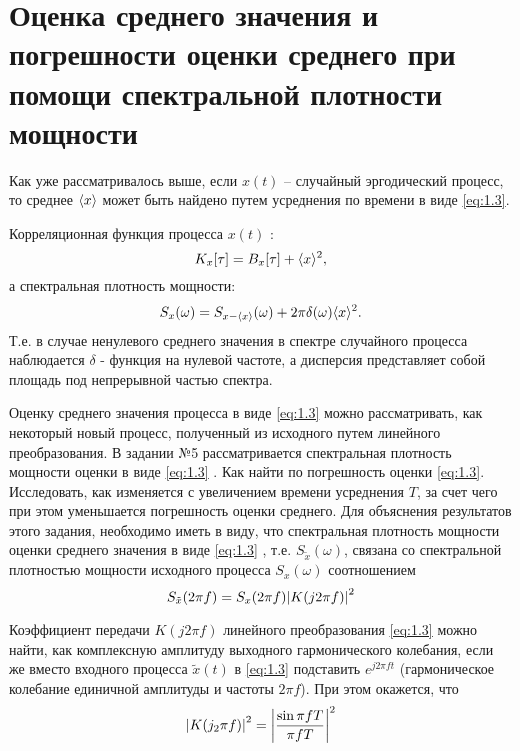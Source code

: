 \documentclass[a4paper,14pt]{extarticle}
\begin{document}
\section{Оценка среднего значения и погрешности оценки среднего при помощи спектральной 
плотности мощности}%

Как уже рассматривалось выше, если $x(t)$ -- случайный эргодический процесс, то среднее
$\langle x\rangle$ может быть найдено путем усреднения по времени в виде \eqref{eq:1.3}.

Корреляционная функция процесса $x(t)$ :
\begin{equation}
    \label{eq:}
    K_x\qty[\tau] = B_x[\tau] + \langle x\rangle^2,
\end{equation}
а спектральная плотность мощности:
\begin{equation}
    \label{eq:}
    S_x(\omega) = S_{x-\langle x\rangle}(\omega) + 2 \pi \delta(\omega) \langle x\rangle^2.
\end{equation}
Т.е. в случае ненулевого среднего значения в спектре случайного процесса наблюдается $\delta$ - 
функция на нулевой частоте, а дисперсия представляет собой площадь под непрерывной частью спектра.

Оценку среднего значения процесса в виде \eqref{eq:1.3}  можно рассматривать, как некоторый новый процесс,
полученный из исходного путем линейного преобразования. В задании №5 рассматривается спектральная плотность мощности  оценки  в виде \eqref{eq:1.3} . Как найти по  погрешность оценки \eqref{eq:1.3}. Исследовать, как изменяется  с увеличением времени усреднения $T$, за счет чего при этом уменьшается погрешность оценки среднего.
Для объяснения результатов этого задания, необходимо иметь в виду, что спектральная плотность мощности оценки среднего значения в виде \eqref{eq:1.3} , т.е. $S_{\tilde x}(\omega)$, связана со спектральной плотностью мощности исходного процесса $S_x(\omega)$  соотношением
\begin{equation}
    \label{eq:4.1}
    S_{\tilde x}(2 \pi f) = S_x(2 \pi f) \abs{K(j 2 \pi f)}^2
\end{equation}

Коэффициент передачи  $K(j 2 \pi f)$ линейного преобразования \eqref{eq:1.3}  можно найти, как комплексную амплитуду выходного гармонического колебания, если же вместо входного 
процесса  $\tilde x(t)$ в \eqref{eq:1.3}  подставить $e^{j 2 \pi f t}$ (гармоническое колебание единичной амплитуды и частоты $2 \pi f$). При этом окажется, что 
\begin{equation}
    \label{eq:4.2}
    \abs{K(j_{2} \pi f)}^2 = \abs{\frac{\sin{\pi f T}}{\pi f T}}^2
\end{equation}
\end{document}
